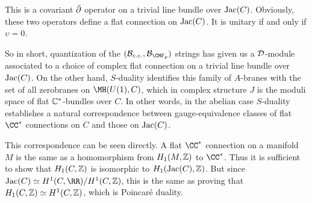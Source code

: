 This is a covariant ${\bar\partial}$ operator on a trivial line bundle
over ${\rm Jac}(C)$. Obviously, these two operators define a flat
connection on ${\rm Jac}(C)$. It is unitary if and only if
$\upsilon=0$.

So in short, quantization of the
$({\cal B}_{c.c.},{\cal B}_{{\CMF}_p})$ strings
has given us a
${\cal D}$-module associated to a choice of complex flat connection
on a trivial line bundle over ${\rm Jac}(C)$.  On the other hand,
$S$-duality identifies this family of $A$-branes with the set of
all zerobranes on $\MH(U(1),C)$, which in complex structure $J$ is
the moduli space of flat $\Bbb{C}^*$-bundles over $C$.  In other
words, in the abelian case $S$-duality establishes a natural
correspondence between gauge-equivalence classes of flat $\CC^*$
connections on $C$ and those on ${\rm Jac}(C)$.

This correspondence can be seen directly.  A flat $\CC^*$
connection on a manifold $M$ is the same as a homomorphism from
$H_1(M,\Bbb{Z})$ to $\CC^*$. Thus it is sufficient to show that
$H_1(C,\Bbb{Z})$ is isomorphic to $H_1({\rm Jac}(C),\Bbb{Z})$. But
since ${\rm Jac}(C)\simeq H^1(C,\RR)/H^1(C,\Bbb{Z})$, this is the
same as proving that $H_1(C,\Bbb{Z})\simeq H^1(C,\Bbb{Z})$, which
is Poincar\'e duality.
